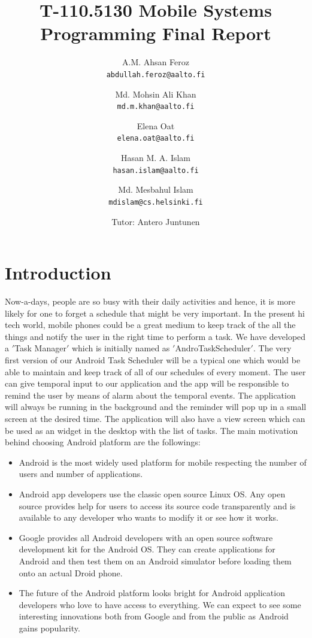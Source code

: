 \documentclass[10pt,a4paper]{report}
\author{A.M. Ahsan Feroz \\
\texttt{abdullah.feroz@aalto.fi}
\and
Md. Mohsin Ali Khan \\
\texttt{md.m.khan@aalto.fi}
\and
Elena Oat\\
\texttt{elena.oat@aalto.fi}
\and
Hasan M. A. Islam \\
\texttt{hasan.islam@aalto.fi}
\and
Md. Mesbahul Islam\\
\texttt{mdislam@cs.helsinki.fi} \\
\and
Tutor: Antero Juntunen
}
\title{T-110.5130 Mobile Systems Programming Final Report}
\begin{document}
\maketitle

\tableofcontents

\chapter{Introduction}
 

Now-a-days, people are so busy with their daily activities and hence, it is more likely for one to forget a schedule that might be very important. In the present hi tech world, mobile phones could be a great medium to keep track of the all the things and notify the user in the right time to perform a task. We have developed a $'$Task Manager$'$ which is initially named as $'$AndroTaskScheduler$'$. The very first version of our Android Task Scheduler will be a typical one which would be able to maintain and keep track of all of our schedules of every moment. The user can give temporal input to our application and the app will be responsible to remind the user by means of alarm about the temporal events. The application will always be running in the background and the reminder will pop up in a small screen at the desired time. The application will also have a view screen which can be used as an widget in the desktop with the list of tasks. The main motivation behind choosing Android platform are the followings:

 \begin{itemize}
   \item Android is the most widely used platform for mobile respecting the number of users and number of applications.
   \item Android app developers use the classic open source Linux OS. Any open source provides help for users to access its source code transparently and is available to any developer who wants to modify it or see how it works.
   \item Google provides all Android developers with an open source software development kit for the Android OS. They can create applications for Android and then test them on an Android simulator before loading them onto an actual Droid phone.
   \item The future of the Android platform looks bright for Android application developers who love to have access to everything. We can expect to see some interesting innovations both from Google and from the public as Android gains popularity.
 \end{itemize}
\end{document}
